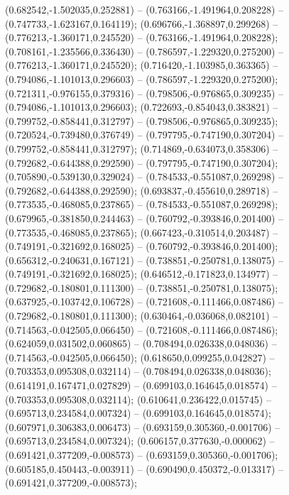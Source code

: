  (0.682542,-1.502035,0.252881) -- (0.763166,-1.491964,0.208228) -- (0.747733,-1.623167,0.164119);
 (0.696766,-1.368897,0.299268) -- (0.776213,-1.360171,0.245520) -- (0.763166,-1.491964,0.208228);
 (0.708161,-1.235566,0.336430) -- (0.786597,-1.229320,0.275200) -- (0.776213,-1.360171,0.245520);
 (0.716420,-1.103985,0.363365) -- (0.794086,-1.101013,0.296603) -- (0.786597,-1.229320,0.275200);
 (0.721311,-0.976155,0.379316) -- (0.798506,-0.976865,0.309235) -- (0.794086,-1.101013,0.296603);
 (0.722693,-0.854043,0.383821) -- (0.799752,-0.858441,0.312797) -- (0.798506,-0.976865,0.309235);
 (0.720524,-0.739480,0.376749) -- (0.797795,-0.747190,0.307204) -- (0.799752,-0.858441,0.312797);
 (0.714869,-0.634073,0.358306) -- (0.792682,-0.644388,0.292590) -- (0.797795,-0.747190,0.307204);
 (0.705890,-0.539130,0.329024) -- (0.784533,-0.551087,0.269298) -- (0.792682,-0.644388,0.292590);
 (0.693837,-0.455610,0.289718) -- (0.773535,-0.468085,0.237865) -- (0.784533,-0.551087,0.269298);
 (0.679965,-0.381850,0.244463) -- (0.760792,-0.393846,0.201400) -- (0.773535,-0.468085,0.237865);
 (0.667423,-0.310514,0.203487) -- (0.749191,-0.321692,0.168025) -- (0.760792,-0.393846,0.201400);
 (0.656312,-0.240631,0.167121) -- (0.738851,-0.250781,0.138075) -- (0.749191,-0.321692,0.168025);
 (0.646512,-0.171823,0.134977) -- (0.729682,-0.180801,0.111300) -- (0.738851,-0.250781,0.138075);
 (0.637925,-0.103742,0.106728) -- (0.721608,-0.111466,0.087486) -- (0.729682,-0.180801,0.111300);
 (0.630464,-0.036068,0.082101) -- (0.714563,-0.042505,0.066450) -- (0.721608,-0.111466,0.087486);
 (0.624059,0.031502,0.060865) -- (0.708494,0.026338,0.048036) -- (0.714563,-0.042505,0.066450);
 (0.618650,0.099255,0.042827) -- (0.703353,0.095308,0.032114) -- (0.708494,0.026338,0.048036);
 (0.614191,0.167471,0.027829) -- (0.699103,0.164645,0.018574) -- (0.703353,0.095308,0.032114);
 (0.610641,0.236422,0.015745) -- (0.695713,0.234584,0.007324) -- (0.699103,0.164645,0.018574);
 (0.607971,0.306383,0.006473) -- (0.693159,0.305360,-0.001706) -- (0.695713,0.234584,0.007324);
 (0.606157,0.377630,-0.000062) -- (0.691421,0.377209,-0.008573) -- (0.693159,0.305360,-0.001706);
 (0.605185,0.450443,-0.003911) -- (0.690490,0.450372,-0.013317) -- (0.691421,0.377209,-0.008573);

